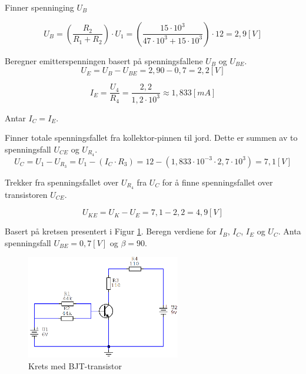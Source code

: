 \begin{solution}[name=Løsningsforslag oppgave]
Finner spenninging $U_B$

\[U_B= \left(\frac{R_2}{R_1+R_2} \right) \cdot U_1 = \left(\frac{15 \cdot 10^3}{47 \cdot 10^3 + 15 \cdot 10^3} \right) \cdot 12 = 2,9 [V]\]

Beregner emitterspenningen basert på spenningsfallene  $U_B$ og $U_{BE}$.
\[U_E = U_B - U_{BE}=2,90-0,7=2,2 [V]\]

\[I_E = \frac{U_4}{R_4}=\frac{2,2}{1,2 \cdot 10^3} \approx 1,833 [mA]\]

Antar $I_C = I_E$.

Finner totale spenningsfallet fra kollektor-pinnen til jord. Dette er summen av to spenningsfall $U_{CE}$ og $U_{R_{4}}$.
\[U_C = U_1-U_{R_{3}}=U_1-(I_C \cdot R_3)=12-(1,833 \cdot 10^{-3} \cdot 2,7 \cdot 10^{3})=7,1 [V]\]

Trekker fra spenningsfallet over $U_{R_{4}}$ fra $U_C$ for å finne spenningsfallet over transistoren $U_{CE}$.

\[U_{KE} = U_K-U_E=7,1-2,2=4,9 [V]\]

\end{solution}

\vspace{0.5cm} %


\begin{question}[name=Oppgave, topic=transBJT]
	Basert på kretsen presentert i Figur \ref{fig:tranBJT4}. Beregn verdiene for $I_B$, $I_C$, $I_E$ og $U_C$. Anta spenningsfall $U_{BE}=0,7[V]$ og $\beta=90$.
	
	\begin{figure}[H]
		\centering
		\includegraphics[width=0.6\textwidth]{transistor-BJT/figurer/krets4.png}
		\caption{Krets med BJT-transistor}
		\label{fig:tranBJT4}
	\end{figure}
	
\end{question}

